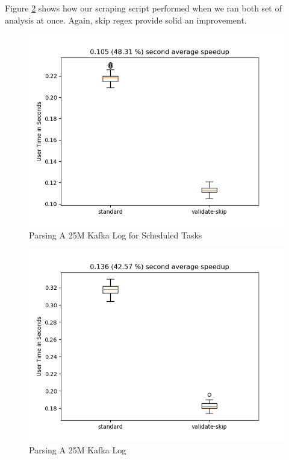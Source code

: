 Figure \ref{fig:append:named} shows how our scraping script
performed when we ran both set of analysis at once. Again,
skip regex provide solid an improvement.

\begin{figure}
\caption{Parsing A 25M Kafka Log for Scheduled Tasks}
\label{fig:named}

\includegraphics{resources/named.png}
\end{figure}

\begin{figure}
\caption{Parsing A 25M Kafka Log}
\label{fig:append:named}

\includegraphics{resources/append-named.png}
\end{figure}

